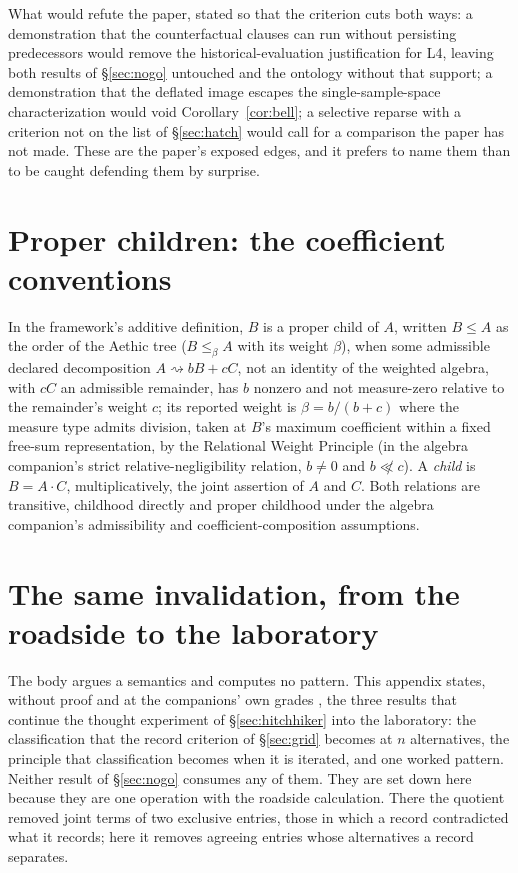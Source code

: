 What would refute the paper, stated so that the criterion cuts both ways: a demonstration that the counterfactual clauses can run without persisting predecessors would remove the historical-evaluation justification for L4, leaving both results of \S\ref{sec:nogo} untouched and the ontology without that support; a demonstration that the deflated image escapes the single-sample-space characterization would void Corollary~\ref{cor:bell}; a selective reparse with a criterion not on the list of \S\ref{sec:hatch} would call for a comparison the paper has not made. These are the paper's exposed edges, and it prefers to name them than to be caught defending them by surprise.



\appendix
\section{Proper children: the coefficient conventions}\label{app:properchild}

In the framework's additive definition, $B$ is a proper child of $A$, written $B \le A$ as the order of the Aethic tree ($B \le_\beta A$ with its weight $\beta$), when some admissible declared decomposition $A \rightsquigarrow bB + cC$, not an identity of the weighted algebra, with $cC$ an admissible remainder, has $b$ nonzero and not measure-zero relative to the remainder's weight $c$; its reported weight is $\beta = b/(b + c)$ where the measure type admits division, taken at $B$'s maximum coefficient within a fixed free-sum representation, by the Relational Weight Principle (in the algebra companion's strict relative-negligibility relation, $b \ne 0$ and $b \not\ll c$). A \emph{child} is $B = A \cdot C$, multiplicatively, the joint assertion of $A$ and $C$. Both relations are transitive, childhood directly and proper childhood under the algebra companion's admissibility and coefficient-composition assumptions.

\section{The same invalidation, from the roadside to the laboratory}\label{app:order}

The body argues a semantics and computes no pattern. This appendix states, without proof and at the companions' own grades \cite{AethusQuant, Aethus}, the three results that continue the thought experiment of \S\ref{sec:hitchhiker} into the laboratory: the classification that the record criterion of \S\ref{sec:grid} becomes at $n$ alternatives, the principle that classification becomes when it is iterated, and one worked pattern. Neither result of \S\ref{sec:nogo} consumes any of them. They are set down here because they are one operation with the roadside calculation. There the quotient removed joint terms of two exclusive entries, those in which a record contradicted what it records; here it removes agreeing entries whose alternatives a record separates.

